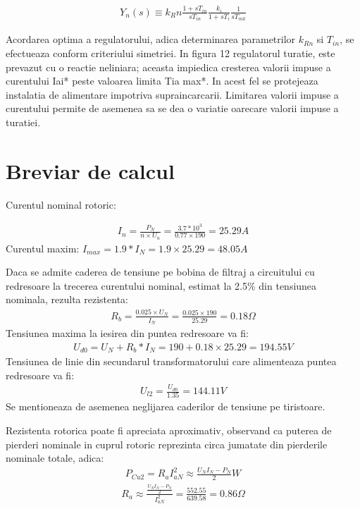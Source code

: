 \documentclass[11pt]{article}
\begin{document}
\begin{align}
Y_n(s)\equiv k_Rn \frac{1+sT_{in}}{sT_{in}} \frac{k_i}{1+sT_i} \frac{1}{sT_{mk}}
\end{align}

Acordarea optima a regulatorului, adica determinarea parametrilor $k_{Rn}$ si $T_{in}$, se efectueaza conform criteriului simetriei. In figura 12 regulatorul turatie, este prevazut cu o reactie neliniara; aceasta impiedica cresterea valorii impuse a curentului Iai* peste valoarea limita Tia max*. In acest fel se protejeaza instalatia de alimentare impotriva supraincarcarii. 
Limitarea valorii impuse a curentului permite de asemenea sa se dea o variatie oarecare valorii impuse a turatiei.

\newpage
\section{Breviar de calcul}
Curentul nominal rotoric:

\begin{align*} 
 I_n=\frac{P_N}{n\times U_n}=\frac{3.7 \ast 10^3}{0.77 \times 190}=25.29A
 \end{align*}
 Curentul maxim: $I_{max}=1.9\ast I_N=1.9\times 25.29 = 48.05 A$
 
 Daca se admite caderea de tensiune pe bobina de filtraj a circuitului cu redresoare la trecerea curentului nominal, estimat la 2.5\% din tensiunea nominala, rezulta rezistenta:
 \begin{align*} 
 R_b=\frac{0.025\times U_N}{I_N}=\frac{0.025\times 190}{25.29}=0.18\Omega
 \end{align*}
 Tensiunea maxima la iesirea din puntea redresoare va fi:
 \begin{align*} 
 U_{d0}=U_N+R_b\ast I_N= 190+0.18\times 25.29=194.55 V
 \end{align*}
 Tensiunea de linie din secundarul transformatorului care alimenteaza puntea redresoare va fi:
 \begin{align*} 
U_{l2}=\frac{U_{d0}}{1.35}=144.11 V
 \end{align*}
Se mentioneaza de asemenea neglijarea caderilor de tensiune pe tiristoare.

Rezistenta rotorica poate fi apreciata aproximativ, observand ca puterea de pierderi nominale in cuprul rotoric reprezinta circa jumatate din pierderile nominale totale, adica:
\begin{align*} 
P_{Cu2}=R_aI_{aN}^2\approx\frac{U_NI_N-P_N}{2}W
\end{align*}
\begin{align*}
R_a\approx\frac{\frac{U_NI_N-P_N}{2}}{I_{aN}^2}=\frac{552.55}{639.58}=0.86\Omega
\end{align*}
\end{document}
